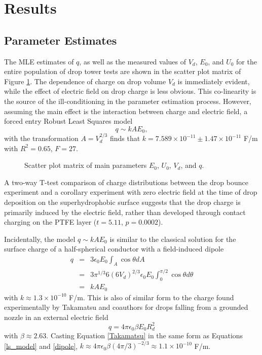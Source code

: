 \documentclass[aip,reprint, floatfix]{revtex4-1}
\begin{document}
\section{Results}
\subsection{Parameter Estimates}
The MLE estimates of $q$, as well as the measured values of $V_d$, $E_0$, and $U_0$ for the entire population of drop tower tests are shown in the scatter plot matrix of Figure \ref{fig:scatter}. The dependence of charge on drop volume $V_d$ is immediately evident, while the effect of electric field on drop charge is less obvious. This co-linearity is the source of the ill-conditioning in the parameter estimation process. However, assuming the main effect is the interaction between charge and electric field, a forced entry Robust Least Squares model 
\begin{equation}
q \sim kAE_0,
\label{ls_model}
\end{equation} 
with the transformation $A = V_d^{2/3}$ finds that $k=7.589 \times 10^{-11} \pm  1.47 \times 10^{-11}$ F/m with $R^2 = 0.65$, $F=27$. 
\begin{figure}[h]
    \centering
    \resizebox{0.5\textwidth}{!}{}
    \caption{Scatter plot matrix of main parameters $E_0$, $U_0$, $V_d$, and $q$.\label{fig:scatter}}
\end{figure}

A two-way T-test comparison of charge distributions between the drop bounce experiment and a corollary experiment with zero electric field at the time of drop deposition on the superhydrophobic surface suggests that the drop charge is primarily induced by the electric field, rather than developed through contact charging on the PTFE layer ($t = 5.11$, $p = 0.0002$).

Incidentally, the model $q \sim kAE_0$ is similar to the classical solution for the surface charge of a half-spherical conductor with a field-induced dipole \cite{david_j._griffiths_introduction_1999}
\begin{eqnarray}
q &=& 3 \epsilon_0 E_0 \int_A \cos \theta dA \nonumber \\
&=& 3 \pi^{1/3} 6 \left(6 V_d \right)^{2/3} \epsilon_0 E_0 \int^{\pi / 2}_{0} \!\!\!\!\! \cos \theta d\theta \nonumber \\
&=& k A E_0 \label{dipole}
\end{eqnarray}
with $k \approx 1.3 \times 10^{-10}$ F/m. This is also of similar form to the charge found experimentally by Takamatsu and coauthors for drops falling from a grounded nozzle in an external electric field \cite{takamatsu_theoretical_1981}
\begin{equation}
q = 4 \pi \epsilon_0 \beta E_0 R_d^2
\label{Takamatsu}
\end{equation}
with $\beta \approx 2.63$. Casting Equation \ref{Takamatsu} in the same form as Equations \ref{ls_model} and \ref{dipole}, $k \approx 4 \pi \epsilon_0 \beta (4 \pi/3)^{-2/3} \approx 1.1 \times 10^{-10}$ F/m.
\end{document}
